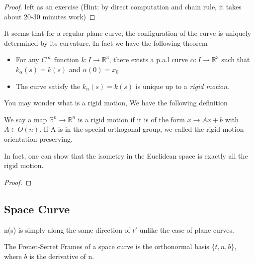 \documentclass{article}
\begin{document}
\begin{proof}
    left as an exercise (Hint: by direct computation and chain rule, it takes about 20-30 minutes work)
\end{proof}

It seems that for a regular plane curve, the configuration of the curve is uniquely determined by its curvature. In fact we have the following theorem

\begin{theorem}
\begin{itemize}
    \item For any $C^{\infty}$ function $k: I\to \mathbb{R}^3 $, there exists a p.a.l curve $\alpha: I\to \mathbb{R}^3 $ such that 
    $k_{\alpha}(s)=k(s)$ and $\alpha(0)=x_0$
    \item The curve satisfy the $k_{\alpha}(s)=k(s)$ is unique up to a \textit{rigid motion}.
\end{itemize}
\end{theorem}
You may wonder what is a rigid motion, We have the following definition
\begin{definition}
We say a map $\mathbb{R}^n\to \mathbb{R}^n$ is a rigid motion if it is of the form $x \to Ax+b$ with $A\in O(n)$. If A is in the special orthogonal group, we called the rigid motion orientation preserving.
    \end{definition}
In fact, one can show that the isometry in the Euclidean space is exactly all the rigid motion.

\begin{proof}
    
\end{proof}

\subsection{Space Curve}

\begin{definition}[curvature]
    
\end{definition}
\begin{remark}
    n(s) is simply along the same direction of $t'$ unlike the case of plane curves.
\end{remark}
The Frenet-Serret Frames of a space curve is the orthonormal basis $\{t,n,b\}$, where $b$ is the derivative of n.
\end{document}
